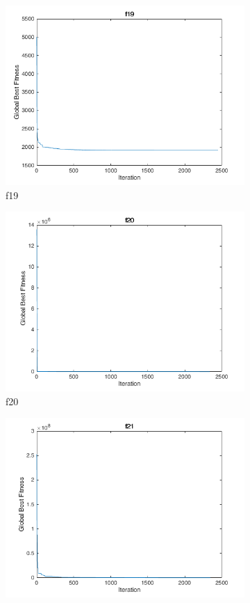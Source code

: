 \begin{figure}
\begin{subfigure}[b]{0.4\textwidth}
    \includegraphics[width=\textwidth]{img/cecrt/f19}
    \caption{f19}
  \end{subfigure}
  \begin{subfigure}[b]{0.4\textwidth}
    \includegraphics[width=\textwidth]{img/cecrt/f20}
    \caption{f20}
  \end{subfigure}
  \begin{subfigure}[b]{0.4\textwidth}
    \includegraphics[width=\textwidth]{img/cecrt/f21}

\end{subfigure}
\end{figure}
